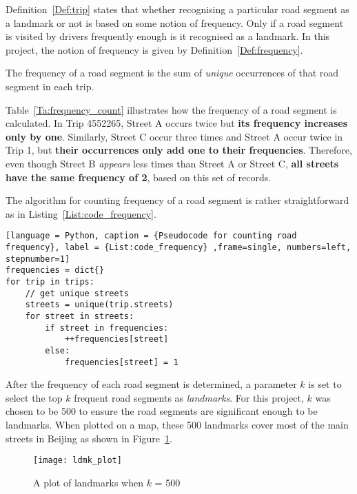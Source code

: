 Definition~\ref{Def:trip} states that whether recognising a particular road segment as a landmark or not is based on some notion of frequency. Only if a road segment is visited by drivers frequently enough is it recognised as a landmark. In this project, the notion of frequency is given by Definition~\ref{Def:frequency}.

\begin{defn}\label{Def:frequency}
The frequency of a road segment is the sum of \emph{unique} occurrences of that road segment in each trip. 
\end{defn}

Table~\ref{Ta:frequency_count} illustrates how the frequency of a road segment is calculated. In Trip 4552265, Street A occurs twice but \textbf{its frequency increases only by one}. Similarly, Street C occur three times and Street A occur twice in Trip 1, but \textbf{their occurrences only add one to their frequencies}. Therefore, even though Street B \emph{appears} less times than Street A or Street C, \textbf{all streets have the same frequency of 2}, based on this set of records.  

The algorithm for counting frequency of a road segment is rather straightforward as in Listing~\ref{List:code_frequency}.

\begin{lstlisting}[language = Python, caption = {Pseudocode for counting road frequency}, label = {List:code_frequency} ,frame=single, numbers=left, stepnumber=1]
frequencies = dict{}
for trip in trips:
 	// get unique streets
	streets = unique(trip.streets)
	for street in streets:
		if street in frequencies:
			++frequencies[street]
		else:
			frequencies[street] = 1
\end{lstlisting}

After the frequency of each road segment is determined, a parameter $k$ is set to select the top $k$ frequent road segments as \emph{landmarks}. For this project, $k$ was chosen to be 500 to ensure the road segments are significant enough to be landmarks. When plotted on a map, these 500 landmarks cover most of the main streets in Beijing as shown in Figure~\ref{Fig:ldmk_500}. 

\begin{figure}[h]
\texttt{[image: ldmk\_plot]}
\centering
\caption{A plot of landmarks when $k$ = 500}\label{Fig:ldmk_500}
\end{figure}

